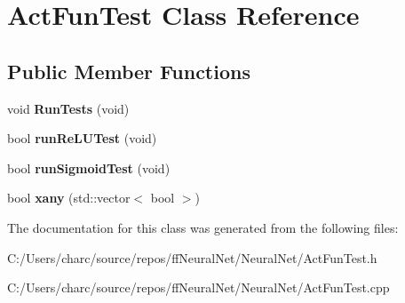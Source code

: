 \hypertarget{class_act_fun_test}{}\section{Act\+Fun\+Test Class Reference}
\label{class_act_fun_test}
\subsection*{Public Member Functions}
\begin{DoxyCompactItemize}
\item 
\mbox{\label{class_act_fun_test_a378665ab0f64d897717b5e6b28aa4afa}} 
void {\bfseries Run\+Tests} (void)
\item 
\mbox{\label{class_act_fun_test_a0ae20979fb12ac63bf7b5441bb05094a}} 
bool {\bfseries run\+Re\+L\+U\+Test} (void)
\item 
\mbox{\label{class_act_fun_test_a377bbed6666f6f9d5179e301fbf2f569}} 
bool {\bfseries run\+Sigmoid\+Test} (void)
\item 
\mbox{\label{class_act_fun_test_a596cae9fffae945ad0f7ef172bbe80f5}} 
bool {\bfseries xany} (std\+::vector$<$ bool $>$)
\end{DoxyCompactItemize}


The documentation for this class was generated from the following files\+:\begin{DoxyCompactItemize}
\item 
C\+:/\+Users/charc/source/repos/ff\+Neural\+Net/\+Neural\+Net/Act\+Fun\+Test.\+h\item 
C\+:/\+Users/charc/source/repos/ff\+Neural\+Net/\+Neural\+Net/Act\+Fun\+Test.\+cpp\end{DoxyCompactItemize}
